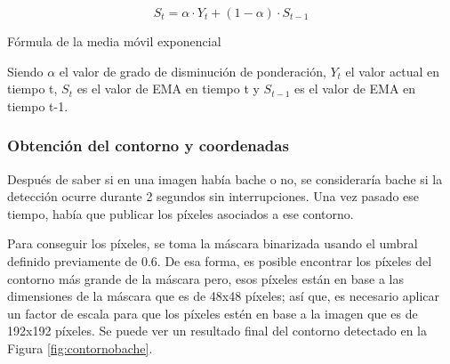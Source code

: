 \begin{myequation}[h]
	\begin{equation}
		S_t = \alpha \cdot Y_t + (1 - \alpha) \cdot S_{t-1}
		\nonumber
	\end{equation}
	\caption[Fórmula de la media móvil exponencial]{Fórmula de la media móvil exponencial}
	\label{ec:ema2}
\end{myequation} 


Siendo $\alpha$  el valor de grado de disminución de ponderación, $Y_t$ el valor actual en tiempo t, $S_t$ es el valor de \acs{EMA} en tiempo t y $S_{t-1}$ es el valor de \acs{EMA} en tiempo t-1.
 
\subsubsection{Obtención del contorno y coordenadas}
\label{subsec:contornoycoordenadas}

Después de saber si en una imagen había bache o no, se consideraría bache si la detección ocurre durante 2 segundos sin interrupciones. Una vez pasado ese tiempo, había que publicar los píxeles asociados a ese contorno. 

Para conseguir los píxeles, se toma la máscara binarizada usando el umbral definido previamente de 0.6. De esa forma, es posible encontrar los píxeles del contorno más grande de la máscara pero, esos píxeles están en base a las dimensiones de la máscara que es de 48x48 píxeles; así que, es necesario aplicar un factor de escala para que los píxeles estén en base a la imagen que es de 192x192 píxeles. Se puede ver un resultado final del contorno detectado en la Figura \ref{fig:contornobache}.
  

